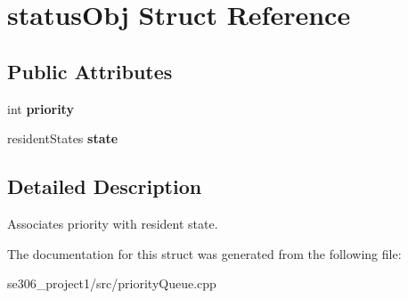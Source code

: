 \hypertarget{structstatusObj}{\section{status\-Obj Struct Reference}
\label{structstatusObj}
}
\subsection*{Public Attributes}
\begin{DoxyCompactItemize}
\item 
\hypertarget{structstatusObj_a133b14a8f17b2b31d52ecf6ef6a8fe6e}{int {\bfseries priority}}\label{structstatusObj_a133b14a8f17b2b31d52ecf6ef6a8fe6e}

\item 
\hypertarget{structstatusObj_a65ed97f7deaf094ed3640b26a3527588}{resident\-States {\bfseries state}}\label{structstatusObj_a65ed97f7deaf094ed3640b26a3527588}

\end{DoxyCompactItemize}


\subsection{Detailed Description}
Associates priority with resident state. 

The documentation for this struct was generated from the following file\-:\begin{DoxyCompactItemize}
\item 
se306\-\_\-project1/src/priority\-Queue.\-cpp\end{DoxyCompactItemize}
